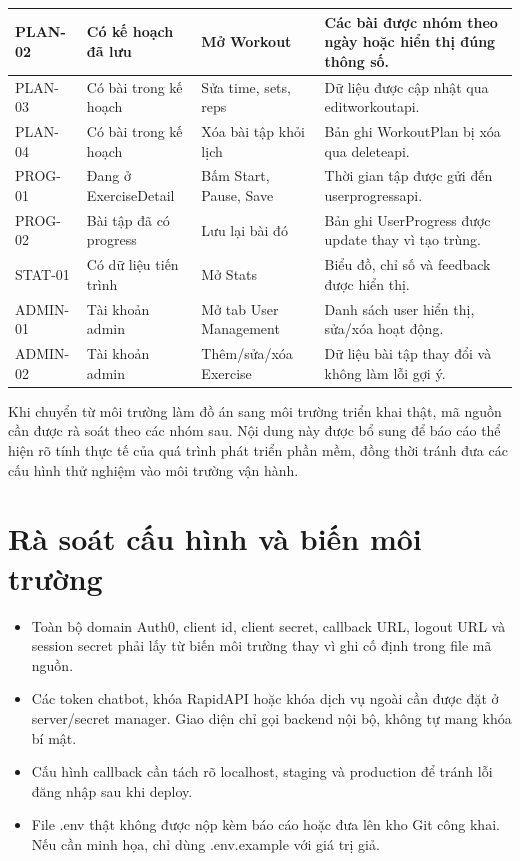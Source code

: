 \begin{longtable}{|P{0.160\textwidth}|P{0.280\textwidth}|P{0.280\textwidth}|P{0.200\textwidth}|}
\hline
PLAN-02 & Có kế hoạch đã lưu & Mở Workout & Các bài được nhóm theo ngày hoặc hiển thị đúng thông số. \\
\hline
PLAN-03 & Có bài trong kế hoạch & Sửa time, sets, reps & Dữ liệu được cập nhật qua editworkoutapi. \\
\hline
PLAN-04 & Có bài trong kế hoạch & Xóa bài tập khỏi lịch & Bản ghi WorkoutPlan bị xóa qua deleteapi. \\
\hline
PROG-01 & Đang ở ExerciseDetail & Bấm Start, Pause, Save & Thời gian tập được gửi đến userprogressapi. \\
\hline
PROG-02 & Bài tập đã có progress & Lưu lại bài đó & Bản ghi UserProgress được update thay vì tạo trùng. \\
\hline
STAT-01 & Có dữ liệu tiến trình & Mở Stats & Biểu đồ, chỉ số và feedback được hiển thị. \\
\hline
ADMIN-01 & Tài khoản admin & Mở tab User Management & Danh sách user hiển thị, sửa/xóa hoạt động. \\
\hline
ADMIN-02 & Tài khoản admin & Thêm/sửa/xóa Exercise & Dữ liệu bài tập thay đổi và không làm lỗi gợi ý. \\
\hline
\end{longtable}
\endgroup


Khi chuyển từ môi trường làm đồ án sang môi trường triển khai thật, mã nguồn cần được rà soát theo các nhóm sau. Nội dung này được bổ sung để báo cáo thể hiện rõ tính thực tế của quá trình phát triển phần mềm, đồng thời tránh đưa các cấu hình thử nghiệm vào môi trường vận hành.


\section{Rà soát cấu hình và biến môi trường}

\begin{itemize}

    \item Toàn bộ domain Auth0, client id, client secret, callback URL, logout URL và session secret phải lấy từ biến môi trường thay vì ghi cố định trong file mã nguồn.

    \item Các token chatbot, khóa RapidAPI hoặc khóa dịch vụ ngoài cần được đặt ở server/secret manager. Giao diện chỉ gọi backend nội bộ, không tự mang khóa bí mật.

    \item Cấu hình callback cần tách rõ localhost, staging và production để tránh lỗi đăng nhập sau khi deploy.

    \item File .env thật không được nộp kèm báo cáo hoặc đưa lên kho Git công khai. Nếu cần minh họa, chỉ dùng .env.example với giá trị giả.

\end{itemize}


